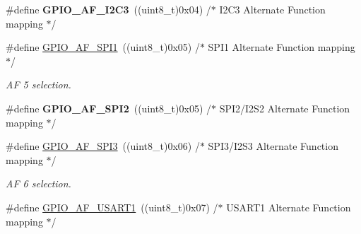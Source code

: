 \begin{DoxyCompactItemize}
\item 
\mbox{\label{group___g_p_i_o___alternat__function__selection__define_ga302620e38b718a54d760845de2a06b2b}} 
\#define {\bfseries G\+P\+I\+O\+\_\+\+A\+F\+\_\+\+I2\+C3}~((uint8\+\_\+t)0x04)  /$\ast$ I2\+C3 Alternate Function mapping $\ast$/
\item 
\mbox{\label{group___g_p_i_o___alternat__function__selection__define_ga7804aaf9275dbb5502312729a76d13be}} 
\#define \hyperlink{group___g_p_i_o___alternat__function__selection__define_ga7804aaf9275dbb5502312729a76d13be}{G\+P\+I\+O\+\_\+\+A\+F\+\_\+\+S\+P\+I1}~((uint8\+\_\+t)0x05)  /$\ast$ S\+P\+I1 Alternate Function mapping $\ast$/
\begin{DoxyCompactList}\small\item\em AF 5 selection. \end{DoxyCompactList}\item 
\mbox{\label{group___g_p_i_o___alternat__function__selection__define_ga45d0fbf9ba0bf0f554697e78712fc369}} 
\#define {\bfseries G\+P\+I\+O\+\_\+\+A\+F\+\_\+\+S\+P\+I2}~((uint8\+\_\+t)0x05)  /$\ast$ S\+P\+I2/\+I2\+S2 Alternate Function mapping $\ast$/
\item 
\mbox{\label{group___g_p_i_o___alternat__function__selection__define_gad6e716ad894aa5299273541c6966864a}} 
\#define \hyperlink{group___g_p_i_o___alternat__function__selection__define_gad6e716ad894aa5299273541c6966864a}{G\+P\+I\+O\+\_\+\+A\+F\+\_\+\+S\+P\+I3}~((uint8\+\_\+t)0x06)  /$\ast$ S\+P\+I3/\+I2\+S3 Alternate Function mapping $\ast$/
\begin{DoxyCompactList}\small\item\em AF 6 selection. \end{DoxyCompactList}\item 
\mbox{\label{group___g_p_i_o___alternat__function__selection__define_ga790e1f37e75f475cf09c211f566fb069}} 
\#define \hyperlink{group___g_p_i_o___alternat__function__selection__define_ga790e1f37e75f475cf09c211f566fb069}{G\+P\+I\+O\+\_\+\+A\+F\+\_\+\+U\+S\+A\+R\+T1}~((uint8\+\_\+t)0x07)  /$\ast$ U\+S\+A\+R\+T1 Alternate Function mapping $\ast$/

\end{DoxyCompactItemize}
